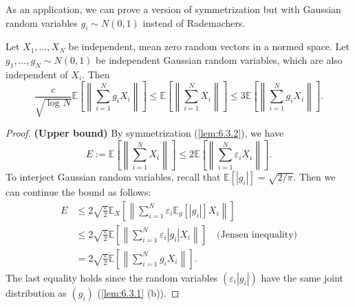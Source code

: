 As an application, we can prove a version of symmetrization but with Gaussian random variables 
$g_i \sim N(0, 1)$ instead of Rademachers.

\begin{lemma}
\label{lem:6.6.2}
Let $X_1, \dots, X_N$ be independent, mean zero random vectors in a normed space. Let $g_1, \dots, g_N 
\sim N(0, 1)$ be independent Gaussian random variables, which are also independent of $X_i$. Then 
\[ \frac{c}{\sqrt{\log_{}{N}}} \mathbb{E}\left[ \left\lVert \sum_{i = 1}^{N} g_iX_i \right\rVert \right] 
\leq \mathbb{E}\left[ \left\lVert \sum_{i = 1}^{N} X_i \right\rVert \right] 
\leq 3 \mathbb{E}\left[ \left\lVert \sum_{i = 1}^{N} g_i X_i \right\rVert \right]. \]
\end{lemma}

\begin{proof}
\textbf{(Upper bound)} By symmetrization (\cref{lem:6.3.2}), we have 
\[ E := \mathbb{E}\left[ \left\lVert \sum_{i = 1}^{N} X_i \right\rVert \right] 
\leq 2 \mathbb{E}\left[ \left\lVert \sum_{i = 1}^{N} \varepsilon_i X_i \right\rVert \right]. \]
To interject Gaussian random variables, recall that $\mathbb{E}\left[ |g_i| \right] = \sqrt{2 / \pi}$. Then 
we can continue the bound as follows: 
\begin{align*}
	E 
	&\leq 2 \sqrt{\frac{\pi}{2}} \mathbb{E}_X\left[ \left\lVert \sum_{i = 1}^{N} \varepsilon_i 
	\mathbb{E}_g\left[ |g_i| \right] X_i \right\rVert \right] \\
	&\leq 2 \sqrt{\frac{\pi}{2}} \mathbb{E}\left[ \left\lVert \sum_{i = 1}^{N} 
	\varepsilon_i |g_i| X_i \right\rVert \right] \quad \text{(Jensen inequality)} \\
	&= 2 \sqrt{\frac{\pi}{2}} \mathbb{E}\left[ \left\lVert \sum_{i = 1}^{N} 
	g_i X_i \right\rVert \right]. 
\end{align*}
The last equality holds since the random variables $(\varepsilon_i |g_i|)$ have the same joint distribution as 
$(g_i)$ (\cref{lem:6.3.1} (b)).


\end{proof}
